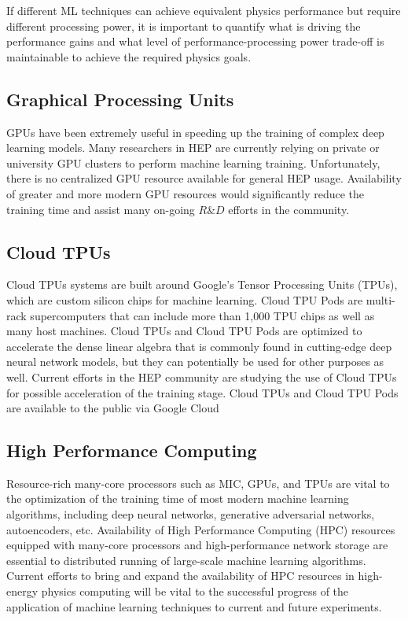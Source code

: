 If different ML techniques can achieve equivalent physics performance but require different processing power, it is important to quantify what is driving the performance gains and what level of performance-processing power trade-off is maintainable to achieve the required physics goals.

\subsection{Graphical Processing Units}\label{subsec:GPU}

GPUs have been extremely useful in speeding up the training of complex deep learning models. Many researchers in HEP are currently relying on private or university GPU clusters to perform machine learning training. Unfortunately, there is no centralized GPU resource available for general HEP usage. Availability of greater and more modern GPU resources would significantly reduce the training time and assist many on-going $R\&D$ efforts in the community.

\subsection{Cloud TPUs}\label{subsec:TPU}

Cloud TPUs systems are built around Google's Tensor Processing Units (TPUs), which are custom silicon chips for machine learning. Cloud TPU Pods are multi-rack supercomputers that can include more than 1,000 TPU chips as well as many host machines. Cloud TPUs and Cloud TPU Pods are optimized to accelerate the dense linear algebra that is commonly found in cutting-edge deep neural network models, but they can potentially be used for other purposes as well. Current efforts in the HEP community are studying the use of Cloud TPUs for possible acceleration of the training stage. Cloud TPUs and Cloud TPU Pods are available to the public via Google Cloud ~\cite{cloudgoogle}

\subsection{High Performance Computing}

Resource-rich many-core processors such as MIC, GPUs, and TPUs are vital to the optimization of the training time of most modern machine learning algorithms, including deep neural networks, generative adversarial networks, autoencoders, etc. Availability of High Performance Computing (HPC) resources equipped with many-core processors and high-performance network storage are essential to distributed running of large-scale machine learning algorithms. Current efforts to bring and expand the availability of HPC resources in high-energy physics computing will be vital to the successful progress of the application of machine learning techniques to current and future experiments.

